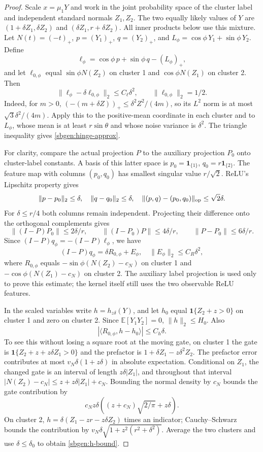 \documentclass{article} %
\theoremstyle{plain}
\theoremstyle{definition}
\theoremstyle{remark}
\begin{document}
\begin{proof}
Scale $x=\mu_1Y$ and work in the joint probability space of the cluster
label and independent standard normals $Z_1,Z_2$. The two equally likely
values of $Y$ are
$(1+\delta Z_1,\delta Z_2)$ and
$(\delta Z_1,r+\delta Z_2)$. All inner products below use this mixture.
Let $N(t)=(-t)_+$, $p=(Y_1)_+$, $q=(Y_2)_+$, and
$L_\phi=\cos\phi\,Y_1+\sin\phi\,Y_2$.
Define
\[
 \ell_\phi=\cos\phi\,p+\sin\phi\,q-(L_\phi)_+,
\]
and let $\ell_{0,\phi}$ equal $\sin\phi N(Z_2)$ on cluster 1 and
$\cos\phi N(Z_1)$ on cluster 2. Then
\begin{equation}\label{sbgen:hinge-approx}
 \|\ell_\phi-\delta\ell_{0,\phi}\|_2\le C_\ell\delta^2,
 \qquad\|\ell_{0,\phi}\|_2=1/2.
\end{equation}
Indeed, for $m>0$,
$(-(m+\delta Z))_+\le\delta^2Z^2/(4m)$, so its $L^2$ norm is at
most $\sqrt3\delta^2/(4m)$. Apply this to the positive-mean coordinate
in each cluster and to $L_\phi$, whose mean is at least
$r\sin\theta$ and whose noise variance is $\delta^2$. The triangle
inequality gives \eqref{sbgen:hinge-approx}.

For clarity, compare the actual projection $P$ to the auxiliary
projection $P_0$ onto cluster-label constants. A basis of this latter
space is $p_0=\mathbf1_{\{1\}}$, $q_0=r\mathbf1_{\{2\}}$.
The feature map with columns $(p_0,q_0)$ has smallest singular value
$r/\sqrt2$. ReLU's Lipschitz property gives
\[
 \|p-p_0\|_2\le\delta,\quad\|q-q_0\|_2\le\delta,
 \quad \|(p,q)-(p_0,q_0)\|_{\rm op}\le\sqrt2\delta.
\]
For $\delta\le r/4$ both columns remain independent. Projecting their
difference onto the orthogonal complements gives
\[
 \|(I-P)P_0\|\le2\delta/r,\qquad
 \|(I-P_0)P\|\le4\delta/r,
 \qquad\|P-P_0\|\le6\delta/r.
\]
Since $(I-P)q_\phi=-(I-P)\ell_\phi$, we have
\[
 (I-P)q_\phi=\delta R_{0,\phi}+E_\phi,
 \quad \|E_\phi\|_2\le C_R\delta^2,
\]
where $R_{0,\phi}$ equals
$-\sin\phi(N(Z_2)-c_N)$ on cluster 1 and
$-\cos\phi(N(Z_1)-c_N)$ on cluster 2.
The auxiliary label projection is used only to prove this estimate;
the kernel itself still uses the two observable ReLU features.

In the scaled variables write $h=h_{z\delta}(Y)$, and let $h_0$ equal
$\mathbf1\{Z_2+z>0\}$ on cluster 1 and zero on cluster 2.
Since $\mathbb E[Y_1Y_2]=0$,
$\|h\|_2\le H_0$. Also
\begin{equation}\label{sbgen:h-bound}
 |\langle R_{0,\phi},h-h_0\rangle|\le C_h\delta.
\end{equation}
To see this without losing a square root at the moving gate, on cluster 1
the gate is $\mathbf1\{Z_2+z+z\delta Z_1>0\}$ and the prefactor is
$1+\delta Z_1-z\delta^2Z_2$. The prefactor error contributes at most
$v_N\delta(1+z\delta)$ in absolute expectation. Conditional on $Z_1$,
the changed gate is an interval of length $z\delta|Z_1|$, and throughout
that interval
$|N(Z_2)-c_N|\le z+z\delta|Z_1|+c_N$.
Bounding the normal density by $c_N$ bounds the gate contribution by
\[
 c_Nz\delta\left((z+c_N)\sqrt{2/\pi}+z\delta\right).
\]
On cluster 2, $h=\delta(Z_1-zr-z\delta Z_2)$ times an indicator;
Cauchy--Schwarz bounds the contribution by
$v_N\delta\sqrt{1+z^2(r^2+\delta^2)}$.
Average the two clusters and use $\delta\le\delta_0$ to obtain
\eqref{sbgen:h-bound}.


\end{proof}
\end{document}
